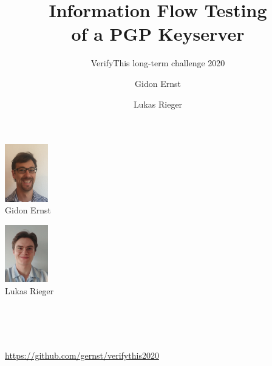 \documentclass[12pt,english,dvipsnames]{beamer}
\author{Gidon Ernst \and Lukas Rieger}
\title{Information Flow Testing\\of a PGP Keyserver}
\subtitle{VerifyThis long-term challenge 2020}
\institute[LMU Munich]{LMU Munich, Germany}
\date{}
\newcommand{\code}[1]{\text{\upshape\ttfamily#1}}
\begin{document}
\begin{frame}
    \centering
    {\Large \inserttitle}
    \bigskip

    {       \insertsubtitle}

    \bigskip

    \begin{minipage}[b]{2.5cm}
      \centering
    \includegraphics[height=2.5cm]{images/gernst} \\
    Gidon Ernst
    \end{minipage}
    \quad
    \begin{minipage}[b]{2.5cm}
      \centering
    \includegraphics[height=2.5cm]{images/lrieger} \\
    Lukas Rieger
    \end{minipage}
    \quad
    \begin{minipage}[b]{3cm}
      \centering
    \resizebox{!}{1cm}{} \\[1em]
    \resizebox{!}{1cm}{}  \\[1em]
    \end{minipage}

    \bigskip

     \quad {} \\
    \url{https://github.com/gernst/verifythis2020}
\end{frame}

\end{document}
